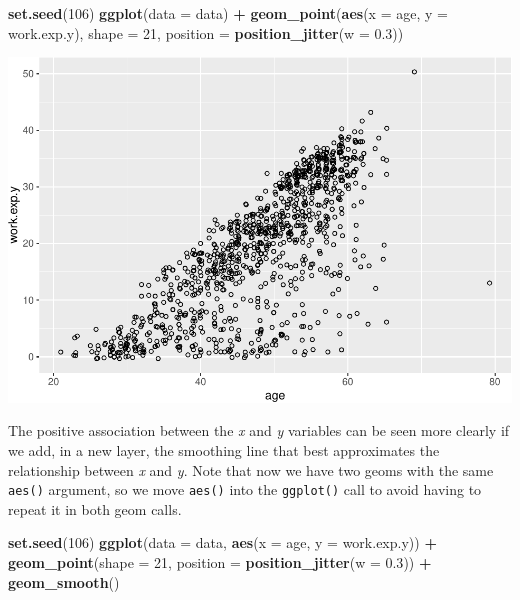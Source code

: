 \documentclass[
]{book}
\newenvironment{Shaded}{\begin{snugshade}}{\end{snugshade}}
\newcommand{\AttributeTok}[1]{\textcolor[rgb]{0.13,0.29,0.53}{#1}}
\newcommand{\DecValTok}[1]{\textcolor[rgb]{0.00,0.00,0.81}{#1}}
\newcommand{\FloatTok}[1]{\textcolor[rgb]{0.00,0.00,0.81}{#1}}
\newcommand{\FunctionTok}[1]{\textcolor[rgb]{0.13,0.29,0.53}{\textbf{#1}}}
\newcommand{\NormalTok}[1]{#1}
\newcommand{\SpecialCharTok}[1]{\textcolor[rgb]{0.81,0.36,0.00}{\textbf{#1}}}
\begin{document}
\begin{Shaded}
\begin{Highlighting}[]
\FunctionTok{set.seed}\NormalTok{(}\DecValTok{106}\NormalTok{)}
\FunctionTok{ggplot}\NormalTok{(}\AttributeTok{data =}\NormalTok{ data) }\SpecialCharTok{+}
  \FunctionTok{geom\_point}\NormalTok{(}\FunctionTok{aes}\NormalTok{(}\AttributeTok{x =}\NormalTok{ age, }\AttributeTok{y =}\NormalTok{ work.exp.y), }\AttributeTok{shape =} \DecValTok{21}\NormalTok{, }\AttributeTok{position =} \FunctionTok{position\_jitter}\NormalTok{(}\AttributeTok{w =} \FloatTok{0.3}\NormalTok{))}
\end{Highlighting}
\end{Shaded}

\includegraphics{R-for-social-research-and-business-analytics_files/figure-latex/unnamed-chunk-31-1.pdf}

The positive association between the \emph{x} and \emph{y} variables can be seen more clearly if we add, in a new layer, the smoothing line that best approximates the relationship between \emph{x} and \emph{y}. Note that now we have two geoms with the same \texttt{aes()} argument, so we move \texttt{aes()} into the \texttt{ggplot()} call to avoid having to repeat it in both geom calls.

\begin{Shaded}
\begin{Highlighting}[]
\FunctionTok{set.seed}\NormalTok{(}\DecValTok{106}\NormalTok{)}
\FunctionTok{ggplot}\NormalTok{(}\AttributeTok{data =}\NormalTok{ data, }\FunctionTok{aes}\NormalTok{(}\AttributeTok{x =}\NormalTok{ age, }\AttributeTok{y =}\NormalTok{ work.exp.y)) }\SpecialCharTok{+}
  \FunctionTok{geom\_point}\NormalTok{(}\AttributeTok{shape =} \DecValTok{21}\NormalTok{, }\AttributeTok{position =} \FunctionTok{position\_jitter}\NormalTok{(}\AttributeTok{w =} \FloatTok{0.3}\NormalTok{)) }\SpecialCharTok{+}
  \FunctionTok{geom\_smooth}\NormalTok{()}
\end{Highlighting}
\end{Shaded}
\end{document}
